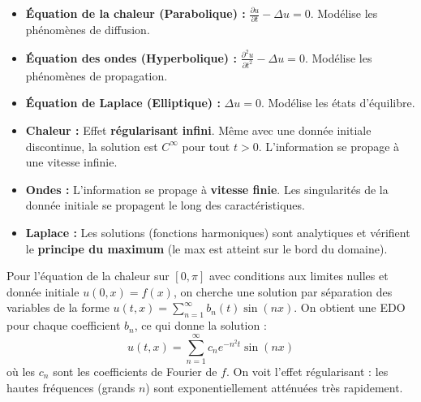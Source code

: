 \begin{definition}
    \begin{itemize}
        \item \textbf{Équation de la chaleur (Parabolique) :} $\frac{\partial u}{\partial t} - \Delta u = 0$. Modélise les phénomènes de diffusion.
        \item \textbf{Équation des ondes (Hyperbolique) :} $\frac{\partial^2 u}{\partial t^2} - \Delta u = 0$. Modélise les phénomènes de propagation.
        \item \textbf{Équation de Laplace (Elliptique) :} $\Delta u = 0$. Modélise les états d'équilibre.
    \end{itemize}
\end{definition}

\begin{proposition}
    \begin{itemize}
        \item \textbf{Chaleur :} Effet \textbf{régularisant infini}. Même avec une donnée initiale discontinue, la solution est $C^\infty$ pour tout $t>0$. L'information se propage à une vitesse infinie.
        \item \textbf{Ondes :} L'information se propage à \textbf{vitesse finie}. Les singularités de la donnée initiale se propagent le long des caractéristiques.
        \item \textbf{Laplace :} Les solutions (fonctions harmoniques) sont analytiques et vérifient le \textbf{principe du maximum} (le max est atteint sur le bord du domaine).
    \end{itemize}
\end{proposition}

\begin{application}
    Pour l'équation de la chaleur sur $[0, \pi]$ avec conditions aux limites nulles et donnée initiale $u(0,x)=f(x)$, on cherche une solution par séparation des variables de la forme $u(t,x) = \sum_{n=1}^\infty b_n(t) \sin(nx)$. On obtient une EDO pour chaque coefficient $b_n$, ce qui donne la solution :
    $$ u(t,x) = \sum_{n=1}^\infty c_n e^{-n^2 t} \sin(nx) $$
    où les $c_n$ sont les coefficients de Fourier de $f$. On voit l'effet régularisant : les hautes fréquences (grands $n$) sont exponentiellement atténuées très rapidement.
\end{application}